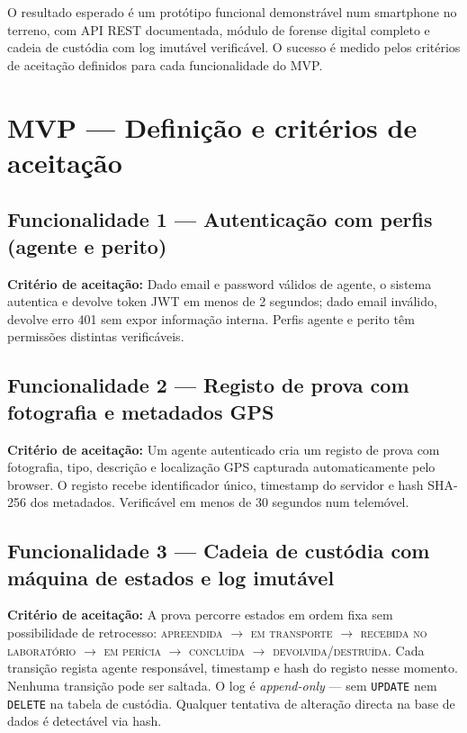 \documentclass[a4paper,11pt]{article}
\begin{document}
O resultado esperado é um protótipo funcional demonstrável num smartphone no terreno,
com API REST documentada, módulo de forense digital completo e cadeia de custódia
com log imutável verificável. O sucesso é medido pelos critérios de aceitação
definidos para cada funcionalidade do MVP.

\section{MVP --- Definição e critérios de aceitação}

\subsection{Funcionalidade 1 --- Autenticação com perfis (agente e perito)}

\textbf{Critério de aceitação:}
Dado email e password válidos de agente, o sistema autentica e devolve token JWT em
menos de 2 segundos; dado email inválido, devolve erro 401 sem expor informação
interna. Perfis agente e perito têm permissões distintas verificáveis.

\subsection{Funcionalidade 2 --- Registo de prova com fotografia e metadados GPS}

\textbf{Critério de aceitação:}
Um agente autenticado cria um registo de prova com fotografia, tipo, descrição e
localização GPS capturada automaticamente pelo browser. O registo recebe
identificador único, timestamp do servidor e hash SHA-256 dos metadados.
Verificável em menos de 30 segundos num telemóvel.

\subsection{Funcionalidade 3 --- Cadeia de custódia com máquina de estados e log imutável}

\textbf{Critério de aceitação:}
A prova percorre estados em ordem fixa sem possibilidade de retrocesso:
\textsc{apreendida} $\rightarrow$ \textsc{em transporte} $\rightarrow$
\textsc{recebida no laboratório} $\rightarrow$ \textsc{em perícia} $\rightarrow$
\textsc{concluída} $\rightarrow$ \textsc{devolvida/destruída}.
Cada transição regista agente responsável, timestamp e hash do registo nesse
momento. Nenhuma transição pode ser saltada. O log é \emph{append-only} ---
sem \texttt{UPDATE} nem \texttt{DELETE} na tabela de custódia. Qualquer
tentativa de alteração directa na base de dados é detectável via hash.
\end{document}
